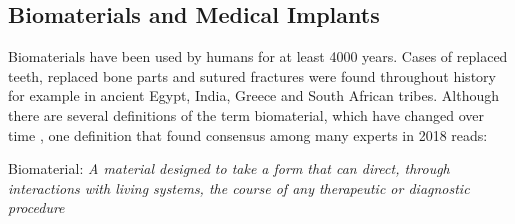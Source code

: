 \subsection{Biomaterials and Medical Implants}

Biomaterials have been used by humans for at least 4000 years. Cases of replaced teeth, replaced bone parts and sutured fractures were found throughout history for example in ancient Egypt, India, Greece and South African tribes\supercite{hernigou_history_2017,al-shalawi_biodegradable_2023,balamurugan_corrosion_2008}. Although there are several definitions of the term biomaterial, which have changed over time \supercite{marin_biomaterials_2020}, one definition that found consensus among many experts in 2018 reads\supercite{ghasemi-mobarakeh_key_2019}:  \\ 
\begin{center}
  \begin{minipage}{0.9\textwidth}
    Biomaterial: 
    \textit{
      A material designed to take a form that can direct, through interactions with living systems, the course of any therapeutic or diagnostic procedure\\
    }
  \end{minipage}
\end{center}
